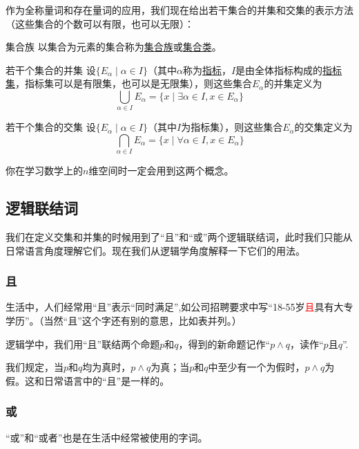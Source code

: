 \documentclass[lang=cn,math=cm,chinesefont=nofont,11pt,scheme=chinese,twocol]{elegantbook}
\begin{document}
作为全称量词和存在量词的应用，我们现在给出若干集合的并集和交集的表示方法（这些集合的个数可以有限，也可以无限）：

\begin{definition}{集合族}
  以集合为元素的集合称为\underline{集合族}或\underline{集合类}。
\end{definition}

\begin{definition}{若干个集合的并集}
  设$\{E_\alpha\mid\alpha\in I\}$（其中$\alpha$称为\underline{指标}，$I$是由全体指标构成的\underline{指标集}，指标集可以是有限集，也可以是无限集），则这些集合$E_\alpha$的并集定义为$$\bigcup_{\alpha\in I}E_\alpha=\{x\mid\exists\alpha\in I,x\in E_\alpha\}$$
\end{definition}

\begin{definition}{若干个集合的交集}
  设$\{E_\alpha\mid\alpha\in I\}$（其中$I$为指标集），则这些集合$E_\alpha$的交集定义为$$\bigcap_{\alpha\in I}E_\alpha=\{x\mid\forall\alpha\in I,x\in E_\alpha\}$$
\end{definition}

你在学习数学上的$n$维空间时一定会用到这两个概念。

\subsection{逻辑联结词}

我们在定义交集和并集的时候用到了“且”和“或”两个逻辑联结词，此时我们只能从日常语言角度理解它们。现在我们从逻辑学角度解释一下它们的用法。

\subsubsection{且}

生活中，人们经常用“且”表示“同时满足”,如公司招聘要求中写“18-55岁\textcolor{red}{且}具有大专学历”。（当然“且”这个字还有别的意思，比如表并列。）

逻辑学中，我们用“且”联结两个命题$p$和$q$，得到的新命题记作“$p\land q$，读作“$p$且$q$”.

我们规定，当$p$和$q$均为真时，$p\land q$为真；当$p$和$q$中至少有一个为假时，$p\land q$为假。这和日常语言中的“且”是一样的。

\subsubsection{或}

“或”和“或者”也是在生活中经常被使用的字词。
\end{document}
